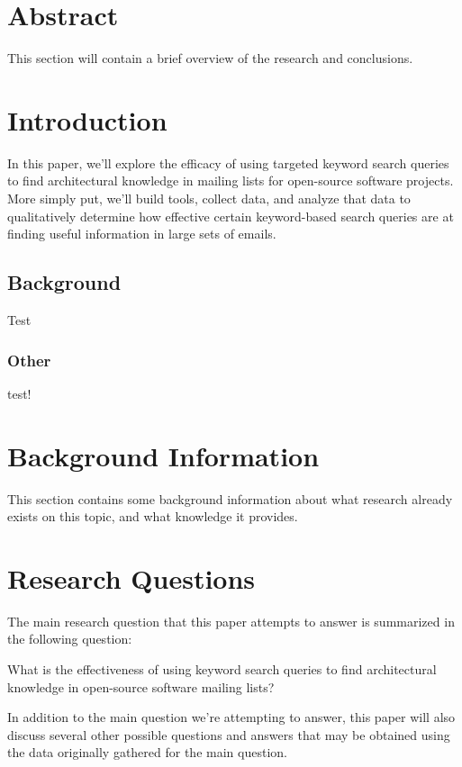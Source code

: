 \documentclass[a4paper, 12pt]{article}
\begin{document}


\section{Abstract}
	This section will contain a brief overview of the research and conclusions.



\section{Introduction}
	In this paper, we'll explore the efficacy of using targeted keyword search queries to find architectural knowledge in mailing lists for open-source software projects. More simply put, we'll build tools, collect data, and analyze that data to qualitatively determine how effective certain keyword-based search queries are at finding useful information in large sets of emails.
	
	\subsection{Background}
		Test
		
		\subsubsection{Other}
			test!

\section{Background Information}
	This section contains some background information about what research already exists on this topic, and what knowledge it provides.

\section{Research Questions}
	The main research question that this paper attempts to answer is summarized in the following question:
	
	\begin{center}
		\large What is the effectiveness of using keyword search queries to find architectural knowledge in open-source software mailing lists?
	\end{center}
	
	In addition to the main question we're attempting to answer, this paper will also discuss several other possible questions and answers that may be obtained using the data originally gathered for the main question.
	
\end{document}

